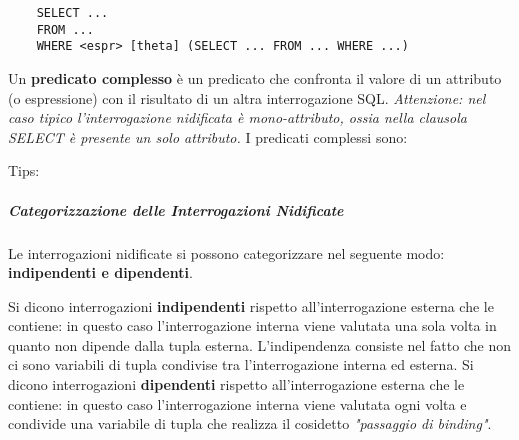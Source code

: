 \documentclass[a4paper]{article}
\begin{document}
	\begin{Verbatim}
	SELECT ...
	FROM ...
	WHERE <espr> [theta] (SELECT ... FROM ... WHERE ...)
	\end{Verbatim}

	Un \textbf{predicato complesso} è un predicato che confronta il valore di un attributo (o espressione) con il risultato di un altra interrogazione SQL.	
	\newline
	\newline
	\emph{Attenzione: nel caso tipico l'interrogazione nidificata è mono-attributo, ossia nella clausola SELECT è presente un solo attributo.}
	\newline
	\newline
	I predicati complessi sono:

	Tips:

	\subparagraph{Categorizzazione delle Interrogazioni Nidificate}
	Le interrogazioni nidificate si possono categorizzare nel seguente modo: \textbf{indipendenti e dipendenti}.

	Si dicono interrogazioni \textbf{indipendenti} rispetto all'interrogazione esterna che le contiene: in questo caso l'interrogazione interna viene valutata
	una sola volta in quanto non dipende dalla tupla esterna. L'indipendenza consiste nel fatto che non ci sono variabili di tupla condivise tra l'interrogazione interna ed esterna.
	\newline
	\newline
	Si dicono interrogazioni \textbf{dipendenti} rispetto all'interrogazione esterna che le contiene: in questo caso l'interrogazione interna viene valutata
	ogni volta e condivide una variabile di tupla che realizza il cosidetto \emph{"passaggio di binding"}.


	
\end{document}
